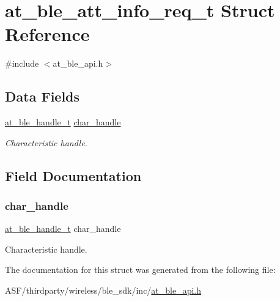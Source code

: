 \hypertarget{structat__ble__att__info__req__t}{}\section{at\+\_\+ble\+\_\+att\+\_\+info\+\_\+req\+\_\+t Struct Reference}
\label{structat__ble__att__info__req__t}


{\ttfamily \#include $<$at\+\_\+ble\+\_\+api.\+h$>$}

\subsection*{Data Fields}
\begin{DoxyCompactItemize}
\item 
\mbox{\hyperlink{at__ble__api_8h_abd23646d0c662860741f787efc8456f2}{at\+\_\+ble\+\_\+handle\+\_\+t}} \mbox{\hyperlink{structat__ble__att__info__req__t_abf2dd98b1df5d9471f3e18780eb5e5a7}{char\+\_\+handle}}
\begin{DoxyCompactList}\small\item\em Characteristic handle. \end{DoxyCompactList}\end{DoxyCompactItemize}


\subsection{Field Documentation}
\mbox{\label{structat__ble__att__info__req__t_abf2dd98b1df5d9471f3e18780eb5e5a7}} 
\subsubsection{\texorpdfstring{char\_handle}{char\_handle}}
{\footnotesize\ttfamily \mbox{\hyperlink{at__ble__api_8h_abd23646d0c662860741f787efc8456f2}{at\+\_\+ble\+\_\+handle\+\_\+t}} char\+\_\+handle}



Characteristic handle. 



The documentation for this struct was generated from the following file\+:\begin{DoxyCompactItemize}
\item 
A\+S\+F/thirdparty/wireless/ble\+\_\+sdk/inc/\mbox{\hyperlink{at__ble__api_8h}{at\+\_\+ble\+\_\+api.\+h}}\end{DoxyCompactItemize}
